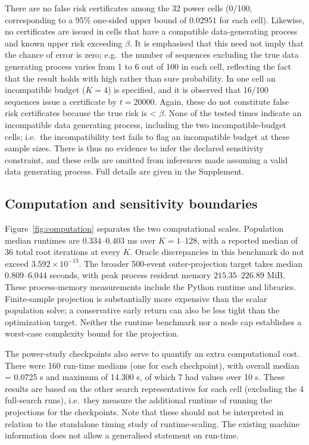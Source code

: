 There are no false risk certificates among the 32 power cells (0/100, corresponding to a 95\% one-sided upper bound of $0.02951$ for each cell). Likewise, no certificates are issued in cells that have a compatible data-generating process and known upper risk exceeding $\beta$. It is emphasised that this need not imply that the chance of error is zero; e.g.\ the number of sequences excluding the true data generating process varies from 1 to 6 out of 100 in each cell, reflecting the fact that the result holds with high rather than sure probability. In one cell an incompatible budget ($K=4$) is specified, and it is observed that 16/100 sequences issue a certificate by $t=20000$. Again, these do not constitute false risk certificates because the true risk is < $\beta$. None of the tested times indicate an incompatible data generating process, including the two incompatible-budget cells; i.e.\ the incompatibility test fails to flag an incompatible budget at these sample sizes. There is thus no evidence to infer the declared sensitivity constraint, and these cells are omitted from inferences made assuming a valid data generating process. Full details are given in the Supplement. 

\subsection{Computation and sensitivity boundaries}
Figure~\ref{fig:computation} separates the two computational scales. Population median runtimes are $0.334$--$0.403$ ms over $K=1$--128, with a reported median of 36 total root iterations at every $K$. Oracle discrepancies in this benchmark do not exceed $3.592\times10^{-13}$. The broader 500-event outer-projection target takes median $0.809$--$6.044$ seconds, with peak process resident memory $215.35$--$226.89$ MiB. These process-memory measurements include the Python runtime and libraries. Finite-sample projection is substantially more expensive than the scalar population solve; a conservative early return can also be less tight than the optimization target. Neither the runtime benchmark nor a node cap establishes a worst-case complexity bound for the projection.

The power-study checkpoints also serve to quantify an extra computational cost. There were 160 run-time medians (one for each checkpoint), with overall median = 0.0725 s and maximum of 14.300 s, of which 7 had values over 10 s. These results are based on the other search representatives for each cell (excluding the 4 full-search runs), i.e.\ they measure the additional runtime of running the projections for the checkpoints. Note that these should not be interpreted in relation to the standalone timing study of runtime-scaling. The existing machine information does not allow a generalised statement on run-time.


